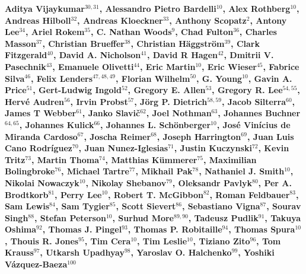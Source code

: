 
{\bf
Aditya Vijaykumar$^{30,31}$, Alessandro Pietro Bardelli$^{10}$, Alex Rothberg$^{10}$, Andreas Hilboll$^{32}$, Andreas Kloeckner$^{33}$, Anthony Scopatz$^{2}$, Antony Lee$^{34}$, Ariel Rokem$^{35}$, C. Nathan Woods$^{9}$, Chad Fulton$^{36}$, Charles Masson$^{37}$, Christian Brueffer$^{38}$, Christian H\"aggstr\"om$^{39}$, Clark Fitzgerald$^{40}$, David A. Nicholson$^{41}$, David R Hagen$^{42}$, Dmitrii V. Pasechnik$^{43}$, Emanuele Olivetti$^{44}$, Eric Martin$^{10}$, Eric Wieser$^{45}$, Fabrice Silva$^{46}$, Felix Lenders$^{47,48,49}$, Florian Wilhelm$^{50}$, G. Young$^{10}$, Gavin A. Price$^{51}$, Gert-Ludwig Ingold$^{52}$, Gregory E. Allen$^{53}$, Gregory R. Lee$^{54,55}$, Herv\'e Audren$^{56}$, Irvin Probst$^{57}$, J\"org P. Dietrich$^{58,59}$, Jacob Silterra$^{60}$, James T Webber$^{61}$, Janko Slavi\v{c}$^{62}$, Joel Nothman$^{63}$, Johannes Buchner$^{64,65}$, Johannes Kulick$^{66}$, Johannes L. Sch\"{o}nberger$^{10}$, Jos\'e Vin\'icius de Miranda Cardoso$^{67}$, Joscha Reimer$^{68}$, Joseph Harrington$^{69}$, Juan Luis Cano Rodr\'iguez$^{70}$, Juan Nunez-Iglesias$^{71}$, Justin Kuczynski$^{72}$, Kevin Tritz$^{73}$, Martin Thoma$^{74}$, Matthias K\"ummerer$^{75}$, Maximilian Bolingbroke$^{76}$, Michael Tartre$^{77}$, Mikhail Pak$^{78}$, Nathaniel J. Smith$^{10}$, Nikolai Nowaczyk$^{10}$, Nikolay Shebanov$^{79}$, Oleksandr Pavlyk$^{80}$, Per A. Brodtkorb$^{81}$, Perry Lee$^{10}$, Robert T. McGibbon$^{82}$, Roman Feldbauer$^{83}$, Sam Lewis$^{84}$, Sam Tygier$^{85}$, Scott Sievert$^{86}$, Sebastiano Vigna$^{87}$, Sourav Singh$^{88}$, Stefan Peterson$^{10}$, Surhud More$^{89,90}$, Tadeusz Pudlik$^{91}$, Takuya Oshima$^{92}$, Thomas J. Pingel$^{93}$, Thomas P. Robitaille$^{94}$, Thomas Spura$^{10}$, Thouis R. Jones$^{95}$, Tim Cera$^{10}$, Tim Leslie$^{10}$, Tiziano Zito$^{96}$, Tom Krauss$^{97}$, Utkarsh Upadhyay$^{98}$, Yaroslav O. Halchenko$^{99}$, Yoshiki V\'azquez-Baeza$^{100}$
}
\newline
\hfill \break
